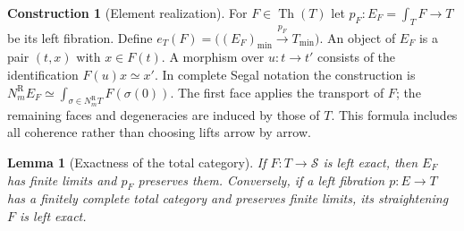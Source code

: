 \documentclass[oneside]{article}
\theoremstyle{plain}
\newtheorem{lemma}[theorem]{Lemma}
\theoremstyle{definition}
\newtheorem{construction}[theorem]{Construction}
\theoremstyle{remark}
\newcommand{\Nn}[1]{N^{\mathrm R}_{#1}}
\newcommand{\Sps}{\mathcal S}
\newcommand{\Th}{\operatorname{Th}}
\newcommand{\eT}{e_T}
\newcommand{\minrep}{\mathrm{min}}
\begin{document}
\begin{construction}[Element realization]\label{con:elements}
For $F\in\Th(T)$ let $p_F:E_F=\int_T F\longrightarrow T$ be its left fibration. Define $\eT(F)=\big((E_F)_{\minrep}\xrightarrow{p_F}T_{\minrep}\big).$ An object of $E_F$ is a pair $(t,x)$ with $x\in F(t)$. A morphism over $u:t\to t'$ consists of the identification $F(u)x\simeq x'$. In complete Segal notation the construction is $\Nn m E_F\simeq \int_{\sigma\in\Nn m T}F(\sigma(0)).$ The first face applies the transport of $F$; the remaining faces and degeneracies are induced by those of $T$. This formula includes all coherence rather than choosing lifts arrow by arrow.
\end{construction}

\begin{lemma}[Exactness of the total category]\label{lem:totallex}
If $F:T\to\Sps$ is left exact, then $E_F$ has finite limits and $p_F$ preserves them. Conversely, if a left fibration $p:E\to T$ has a finitely complete total category and preserves finite limits, its straightening $F$ is left exact.
\end{lemma}
\end{document}
